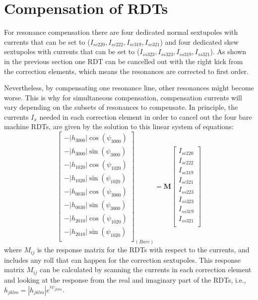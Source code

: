 \section{Compensation of RDTs}

For resonance compensation there are four dedicated normal sextupoles with currents that can be set to ($I_{sc220},I_{sc222},I_{sc319},I_{sc321}$) and four dedicated skew sextupoles with currents that can be set to ($I_{ss323},I_{ss323},I_{ss319},I_{ss321}$). As shown in the previous section one RDT can be cancelled out with the right kick from the correction elements, which means the resonances are corrected to first order. 

Nevertheless, by compensating one resonance line, other resonances  might become worse. This is why for simultaneous compensation, compensation currents will vary depending on the subsets of resonances to compensate. In principle, the currents $I_x$ needed in each correction element in order to cancel out the four bare machine RDTs, are given by the solution to this linear system of equations: 
\begin{equation}
    \begin{bmatrix}
        -|{h_{3000}}|  \cos (\psi_{3000})\\
        -|{h_{3000}}|  \sin (\psi_{3000})\\
        -|{h_{1020}}|  \cos (\psi_{1020})\\
        -|{h_{1020}}|  \sin (\psi_{1020})\\
        -|{h_{0030}}|  \cos (\psi_{3000})\\
        -|{h_{0030}}|  \sin (\psi_{3000})\\
        -|{h_{2010}}|  \cos (\psi_{1020})\\
        -|{h_{2010}}|  \sin (\psi_{1020})\\
      \end{bmatrix}_{(Bare)}
    =
      \boldsymbol{M}
    \begin{bmatrix}
        I_{sc220} \\
        I_{sc222} \\
        I_{sc319} \\
        I_{sc321} \\
        I_{ss223} \\
        I_{ss323} \\
        I_{ss319} \\
        I_{ss321} \\
      \end{bmatrix}
    \label{eq:system}
\end{equation}
where $M_{ij}$ is the response matrix for the RDTs with respect to the currents, and includes any roll that can happen for the correction sextupoles. This response matrix $M_{ij}$ can be calculated by scanning the currents in each correction element and looking at the response from the real and imaginary part of the RDTs, i.e., $h_{jklm}=|h_{jklm}|e^{i\psi_{jklm}}$. 

